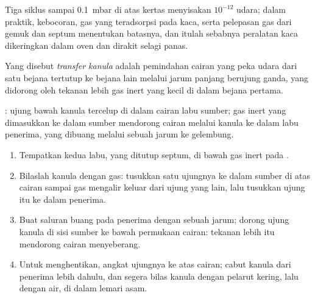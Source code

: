 Tiga siklus sampai \qty{0.1}{mbar} di atas kertas menyisakan $10^{-12}$ udara; dalam praktik, kebocoran, gas
yang teradsorpsi pada kaca, serta pelepasan gas dari gemuk dan septum menentukan batasnya, dan itulah
sebabnya peralatan kaca dikeringkan dalam oven dan dirakit selagi panas.

\begin{definition}\label{def:b3:lab-techniques-3:cannula}
Yang disebut \emph{transfer kanula} adalah pemindahan cairan yang peka udara
dari satu bejana tertutup ke bejana lain melalui jarum panjang berujung ganda, yang didorong
oleh tekanan lebih gas inert yang kecil di dalam bejana pertama.
\end{definition}

\begin{omfigure}

{\small {}: ujung bawah kanula tercelup di dalam cairan labu
sumber; gas inert yang dimasukkan ke dalam sumber mendorong cairan melalui
kanula ke dalam labu penerima, yang dibuang melalui sebuah jarum ke gelembung.}
\end{omfigure}

\begin{method}\label{met:b3:lab-techniques-3:cannula}
\begin{enumerate}
  \item Tempatkan kedua labu, yang ditutup septum, di bawah gas inert pada .
  \item Bilaslah kanula dengan gas: tusukkan satu ujungnya ke dalam sumber di atas cairan
        sampai gas mengalir keluar dari ujung yang lain, lalu tusukkan ujung itu ke dalam penerima.
  \item Buat saluran buang pada penerima dengan sebuah jarum; dorong ujung kanula di sisi sumber ke bawah
        permukaan cairan: tekanan lebih itu mendorong cairan menyeberang.
  \item Untuk menghentikan, angkat ujungnya ke atas cairan; cabut kanula dari penerima
        lebih dahulu, dan segera bilas kanula dengan pelarut kering, lalu dengan air, di dalam lemari asam.
\end{enumerate}
\end{method}

